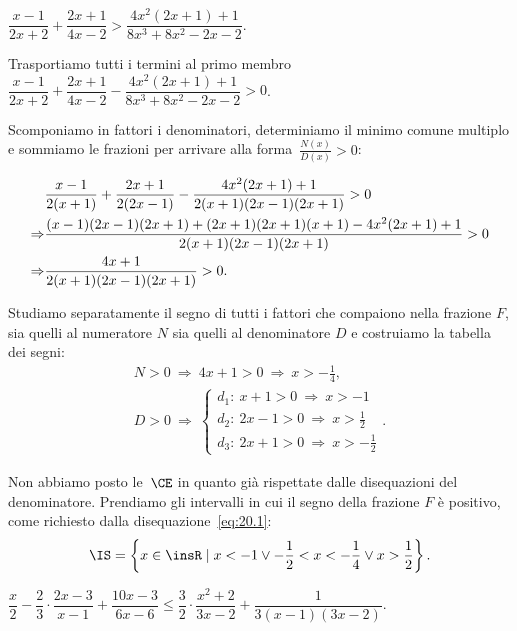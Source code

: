 \begin{exrig}
 \begin{esempio}
 $\dfrac{x-1}{2x+2}+\dfrac{2x+1}{4x-2}>\dfrac{4x^{2}(2x+1)+1}{8x^{3}+8x^{2}-2x-2}.$

Trasportiamo tutti i termini al primo membro~$\dfrac{x-1}{2x+2}+\dfrac{2x+1}{4x-2}-\dfrac{4x^{2}(2x+1)+1}{8x^{3}+8x^{2}-2x-2}>0$.

Scomponiamo in fattori i denominatori, determiniamo il minimo comune
multiplo e sommiamo le frazioni per arrivare alla forma~$\frac{N(x)}{D(x)}>0$:

\begin{align}
&\frac{x-1}{2(x+1)}+\frac{2x+1}{2(2x-1)}-\frac{4x^{2}(2x+1)+1}{2(x+1)(2x-1)(2x+1)}>0 \notag\\
\Rightarrow & \frac{(x-1)(2x-1)(2x+1)+(2x+1)(2x+1)(x+1)-4x^{2}(2x+1)+1}{2(x+1)(2x-1)(2x+1)}>0 \notag\\
\Rightarrow & \frac{4x+1}{2(x+1)(2x-1)(2x+1)}>0. \label{eq:20.1}
\end{align}

Studiamo separatamente il segno di tutti i fattori che compaiono nella
frazione $F$, sia quelli al numeratore $N$ sia quelli al denominatore $D$ e
costruiamo la tabella dei segni:
 \[\begin{gathered}
 N>0\:\Rightarrow\: 4x+1>0\:\Rightarrow\: x>-{\frac{1}{4}}\text{,}\\
 D>0\:\Rightarrow\:\left\{\begin{array}{l}
			d_1:\: x+1>0\:\Rightarrow\: x>-1 \\
			d_2:\: 2x-1>0\:\Rightarrow\: x>\frac{1}{2}\\
			d_3:\: 2x+1>0\:\Rightarrow\: x>-{\frac{1}{2}}
		  \end{array}\right..
\end{gathered}\]
\begin{center}

\end{center}
Non abbiamo posto le~$\CE$ in quanto già rispettate dalle disequazioni
del denominatore.
Prendiamo gli intervalli in cui il segno della frazione $F$ è positivo,
come richiesto dalla disequazione~\ref{eq:20.1}:
 \[\IS=\left\{x\in \insR\mid x<-1\vee -{\frac{1}{2}}<x<-{\frac{1}{4}}\vee x>\frac{1}{2}\right\}.\]
\end{esempio}

 \begin{esempio}
$\dfrac{x}{2}-\dfrac{2}{3}\cdot {\dfrac{2x-3}{x-1}}+\dfrac{10x-3}{6x-6}\le\dfrac{3}{2}\cdot {\dfrac{x^{2}+2}{3x-2}}+\dfrac{1}{3(x-1)(3x-2)}.$


\end{esempio}
\end{exrig}
